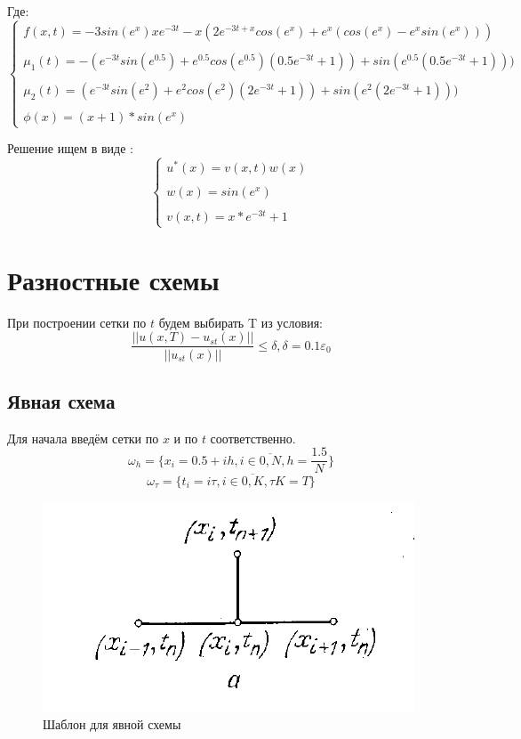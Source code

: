 \documentclass[12pt]{article}
\begin{document}
Где:
$$
\begin{cases}
f(x, t) = -3sin(e^x)xe^{-3t} - x(2e^{-3t+x}cos(e^x)+e^x(cos(e^x) - e^xsin(e^x)))  \\  \\ 
\mu_1(t) = -(e^{-3t}sin(e^{0.5}) + e^{0.5}cos(e^{0.5})(0.5e^{-3t}+1))+sin(e^{0.5}(0.5e^{-3t}+1)))\\ \\
\mu_2(t) = (e^{-3t}sin(e^{2}) + e^{2}cos(e^{2})(2e^{-3t}+1))+sin(e^{2}(2e^{-3t}+1))) \\ \\
\phi(x) = (x+1)*sin(e^x)
\end{cases}
$$

Решение ищем в виде : 
$$
\begin{cases}
u^*(x) = v(x, t)w(x) \\ \\
w(x) = sin(e^x) \\ \\
v(x, t) = x*e^{-3t}+1
\end{cases}
$$ 


\section{Разностные схемы}
При построении сетки по $t$ будем выбирать T из условия:
$$
\dfrac{||u(x, T) - u_{st}(x)||}{||u_{st}(x)||} \leq \delta, \delta = 0.1 \varepsilon_0
$$
\subsection{Явная схема}
Для начала введём сетки по $x$ и по $t$ соответственно.
$$
\omega_h = \{x_i = 0.5 + ih, i \in \overline{0,N}, h = \dfrac{1.5}{N}\} 
$$
$$
\omega_\tau = \{t_i = i\tau, i \in \overline{0,K}, \tau K = T \} 
$$

\begin{figure}[h]
\begin{center}
\includegraphics[scale = 0.8]{exp.png} 
\end{center}
\caption{Шаблон для явной схемы}
\end{figure}
\end{document}

